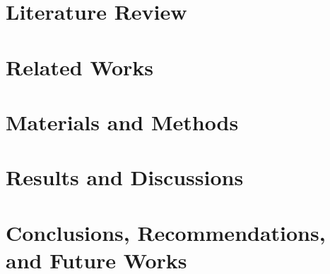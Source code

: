 \documentclass[tg, eng]{ita}    %
\begin{document}
\chapter{Literature Review}\label{chap:literature}


\chapter{Related Works}\label{chap:related}


%

\chapter{Materials and Methods}\label{chap:materials}


\chapter{Results and Discussions}\label{chap:results}


\chapter{Conclusions, Recommendations, and Future Works}\label{chap:conclusion}


%

\renewcommand\bibname{\itareferencesnamebabel} %


%

%
\end{document}
